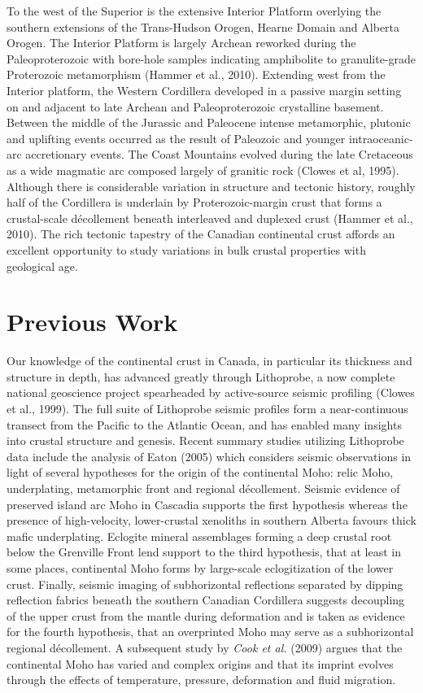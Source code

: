 \documentclass[msc,oneside]{ubcthesis}
\begin{document}
To the west of the Superior is the extensive Interior Platform overlying the southern extensions of the Trans-Hudson Orogen, Hearne Domain and Alberta Orogen. The Interior Platform is largely Archean reworked during the Paleoproterozoic with bore-hole samples indicating amphibolite to granulite-grade Proterozoic metamorphism (Hammer et al., 2010). Extending west from the Interior platform, the Western Cordillera developed in a passive margin setting on and adjacent to late Archean and Paleoproterozoic crystalline basement. Between the middle of the Jurassic and Paleocene intense metamorphic, plutonic and uplifting events occurred as the result of Paleozoic and younger intraoceanic-arc accretionary events. The Coast Mountains evolved during the late Cretaceous as a wide magmatic arc composed largely of granitic rock (Clowes et al, 1995). Although there is considerable variation in structure and tectonic history, roughly half of the Cordillera is underlain by Proterozoic-margin crust that forms a crustal-scale d\'{e}collement beneath interleaved and duplexed crust (Hammer et al., 2010). The rich tectonic tapestry of the Canadian continental crust affords an excellent opportunity to study variations in bulk crustal properties with geological age.

\section{Previous Work}
Our knowledge of the continental crust in Canada, in particular its thickness and structure in depth, has advanced greatly through {\sc Lithoprobe}, a now complete national geoscience project spearheaded by active-source seismic profiling (Clowes et al., 1999). The full suite of {\sc Lithoprobe} seismic profiles form a near-continuous transect from the Pacific to the Atlantic Ocean, and has enabled many insights into crustal structure and genesis. Recent summary studies utilizing {\sc Lithoprobe} data include the analysis of Eaton (2005) which considers seismic observations in light of several hypotheses for the origin of the continental Moho: relic Moho, underplating, metamorphic front and regional d\'{e}collement. Seismic evidence of preserved island arc Moho in Cascadia supports the first hypothesis whereas the presence of high-velocity, lower-crustal xenoliths in southern Alberta favours thick mafic underplating. Eclogite mineral assemblages forming a deep crustal root below the Grenville Front lend support to the third hypothesis, that at least in some places, continental Moho forms by large-scale eclogitization of the lower crust. Finally, seismic imaging of subhorizontal reflections separated by dipping reflection fabrics beneath the southern Canadian Cordillera suggests decoupling of the upper crust from the mantle during deformation and is taken as evidence for the fourth hypothesis, that an overprinted Moho may serve as a subhorizontal regional d\'ecollement. A subsequent study by {\it Cook et al.} (2009) argues that the continental Moho has varied and complex origins and that its imprint evolves through the effects of temperature, pressure, deformation and fluid migration.
\end{document}
